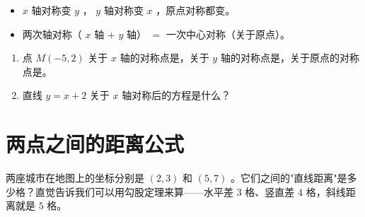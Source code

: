 \begin{keytakeaway}


\begin{itemize}
  \item $x$ 轴对称变 $y$ ， $y$ 轴对称变 $x$ ，原点对称都变。
  \item 两次轴对称（ $x$ 轴 $+$ $y$ 轴） $=$ 一次中心对称（关于原点）。
\end{itemize}


\end{keytakeaway}

\begin{practice}


\begin{enumerate}
  \item 点 $M(-5, 2)$ 关于 $x$ 轴的对称点是\underline{\hspace{2cm}}，关于 $y$ 轴的对称点是\underline{\hspace{2cm}}，关于原点的对称点是\underline{\hspace{2cm}}。
  \item 直线 $y = x + 2$ 关于 $x$ 轴对称后的方程是什么？
\end{enumerate}


\end{practice}



\section*{两点之间的距离公式}


\begin{explore}


两座城市在地图上的坐标分别是 $(2, 3)$ 和 $(5, 7)$ 。它们之间的"直线距离"是多少格？直觉告诉我们可以用勾股定理来算——水平差 $3$ 格、竖直差 $4$ 格，斜线距离就是 $5$ 格。

\end{explore}

